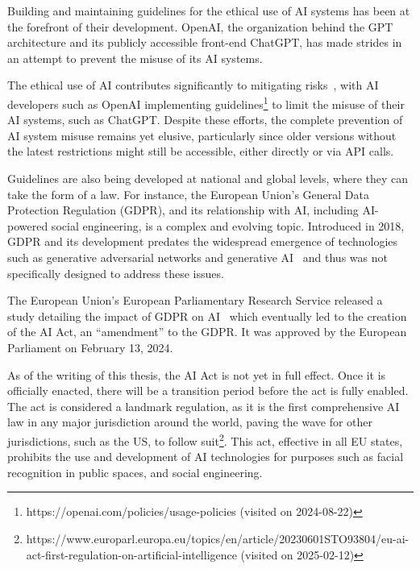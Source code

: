 \begin{comment}
\end{comment}

Building and maintaining guidelines for the ethical use of AI systems has been at the forefront of their development. OpenAI, the organization behind the GPT architecture and its publicly accessible front-end ChatGPT, has made strides in an attempt to prevent the misuse of its AI systems.

The ethical use of AI contributes significantly to mitigating risks~\citep{gupta_From_ChatGPT_to_ThreatGPT_2023}, with AI developers such as OpenAI implementing guidelines\footnote{https://openai.com/policies/usage-policies (visited on 2024-08-22)} to limit the misuse of their AI systems, such as ChatGPT. Despite these efforts, the complete prevention of AI system misuse remains yet elusive, particularly since older versions without the latest restrictions might still be accessible, either directly or via API calls.

Guidelines are also being developed at national and global levels, where they can take the form of a law. For instance, the European Union's General Data Protection Regulation (GDPR), and its relationship with AI, including AI-powered social engineering, is a complex and evolving topic. Introduced in 2018, GDPR and its development predates the widespread emergence of technologies such as generative adversarial networks and generative AI~\citep{goodfellow_Generative_Adversarial_Networks_2020} and thus was not specifically designed to address these issues.

The European Union's European Parliamentary Research Service released a study detailing the impact of GDPR on AI~\citep{eprs_Impact_of_GDPR_on_AI_2020} which eventually led to the creation of the AI Act, an “amendment” to the GDPR. It was approved by the European Parliament on February 13, 2024. 

As of the writing of this thesis, the AI Act is not yet in full effect. Once it is officially enacted, there will be a transition period before the act is fully enabled. The act is considered a landmark regulation, as it is the first comprehensive AI law in any major jurisdiction around the world, paving the wave for other jurisdictions, such as the US, to follow suit\footnote{https://www.europarl.europa.eu/topics/en/article/20230601STO93804/eu-ai-act-first-regulation-on-artificial-intelligence (visited on 2025-02-12)}. This act, effective in all EU states, prohibits the use and development of AI technologies for purposes such as facial recognition in public spaces, and social engineering.



